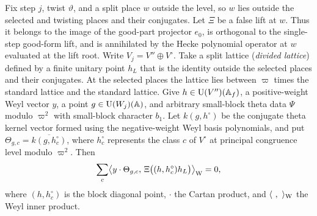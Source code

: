 \begin{lemma}
\label{lem:c-false-slice}
\emitthmsource
Fix step $j$, twist $\vartheta$, and a split place $w$ outside the level, so $w$ lies outside the selected and twisting places and their conjugates. Let $\Xi$ be a false lift at $w$. Thus it belongs to the image of the good-part projector $e_0$, is orthogonal to the single-step good-form lift, and is annihilated by the Hecke polynomial operator at $w$ evaluated at the lift root.
Write $V_j=V''\oplus V^\circ$. Take a split lattice (\emph{divided lattice}) defined by a finite unitary point $h_L$ that is the identity outside the selected places and their conjugates. At the selected places the lattice lies between $\varpi$ times the standard lattice and the standard lattice. Give $h\in \operatorname{U}(V'')(\mathbb A_f)$, a positive-weight Weyl vector $y$, a point $g\in \operatorname{U}(W_j)(\mathbb A)$, and arbitrary small-block theta data $\Psi$ modulo $\varpi^2$ with small-block character $b_1$. Let $k(g,h^\circ)$ be the conjugate theta kernel vector formed using the negative-weight Weyl basis polynomials, and put $\Theta_{g,c}=\overline{k(g,h_c^\circ)}$, where $h_c^\circ$ represents the class $c$ of $V^\circ$ at principal congruence level modulo $\varpi^2$. Then
\[
 \sum_c
 \bigl\langle y\cdot\Theta_{g,c},\,
      \Xi\bigl((h,h_c^\circ)h_L\bigr)\bigr\rangle_{\rm W}=0 ,
\]
where $(h,h_c^\circ)$ is the block diagonal point, $\cdot$ the Cartan product, and $\langle\ ,\ \rangle_{\rm W}$ the Weyl inner product.
\end{lemma}

